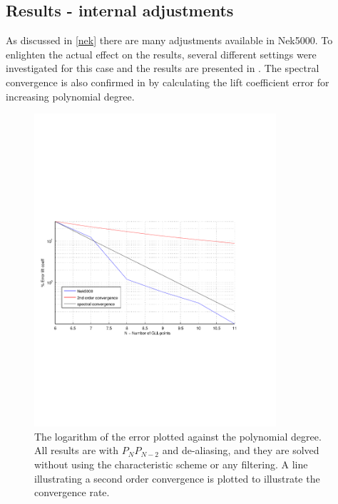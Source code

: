 \subsection{Results - internal adjustments }
As discussed in \cref{nek} there are many adjustments available in Nek5000. 
To enlighten the actual effect on the results, several different settings were 
investigated for this case and the results are presented in . 
The spectral convergence is also confirmed in  by calculating the 
lift coefficient error for increasing polynomial degree. 
%
\begin{figure}[h]
	\centerline{
        \includegraphics[trim=0.5cm 7cm 0.5cm 7cm, width=0.8\textwidth]{Figures/lift_coef4.pdf}}
	\caption{The logarithm of the error plotted against the polynomial degree. All results 
        are with $P_NP_{N-2}$ and de-aliasing, and they are solved without using the 
    characteristic scheme or any filtering. A line illustrating a second order convergence is 
    plotted to illustrate the convergence rate.}
	\label{fig:liftconv}
\end{figure}
%

